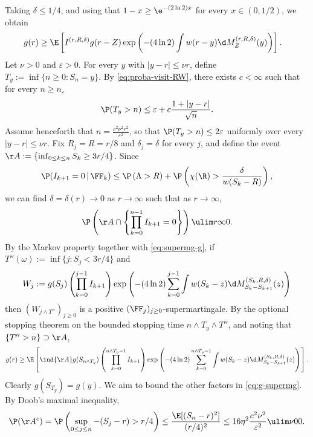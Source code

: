 \documentclass[10pt,a4paper]{article}
\begin{document}
Taking $\delta\leq 1/4$, and using that $1 - x \geq \e^{- (2 \ln 2) x}$ for every $x\in (0,1/2)$, 
we obtain
\begin{align}\label{eq:supermg-g}
g(r) &\geq \E\left[ I^{(r,R,\delta)} g(r-Z) \exp\left(- (4\ln 2) \int w(r-y) \d M_Z^{(r,R,\delta)}(y) \right) \right] .
\end{align}
%
%
Let $\nu>0$ and $\varepsilon>0$. For every $y$ with $|y-r|\leq \nu r$, define $T_y := \inf\{n \geq 0 : S_n = y\}$. By \eqref{eq:proba-visit-RW}, there exists $c<\infty$ such that for every $n\geq n_\varepsilon$ 
\[ \P(T_y > n) \leq \varepsilon + c\frac{1+|y-r|}{\sqrt{n}} . \]
Assume henceforth that $n = \frac{c^2 \nu^2 r^2}{\varepsilon^2}$, so that $\P(T_y > n) \leq 2\varepsilon$ uniformly over every $|y-r|\leq \nu r$. 
%
%
Fix $R_j = R = r/8$ and $\delta_j = \delta$ for every $j$, and define the event $\AA := \{ \inf_{0\leq k \leq n} S_k \geq 3r/4 \}$. 
Since
\[ \P(I_{k+1} = 0 \, | \, \FF_k) \leq \P\left(\Lambda > R\right) + \P\left(\chi(\R)>\frac{\delta}{w(S_k-R)}\right) , \]
we can find $\delta = \delta(r) \to 0$ as $r\to\infty$ such that as $r\to\infty$, %
\[ \P\left(\AA \cap \left\{\prod_{k=0}^{n-1} I_{k+1} = 0 \right\}\right) \ulim r \infty 0 . \]
%
%
By the Markov property together with \eqref{eq:supermg-g}, if $T''(\omega) := \inf\{j : S_j < 3r/4\}$ and 
\begin{align*}
W_j := g(S_j) \left(\prod_{k=0}^{j-1} I_{k+1}\right) \exp\left(- (4\ln 2) \sum_{k=0}^{j-1} \int w(S_k-z) \d M_{S_k-S_{k+1}}^{(S_k, R, \delta)}(z) \right)
\end{align*}
then $(W_{j\wedge T''})_{j\geq 0}$ 
is a positive $(\FF_j)_{j\geq 0}$-supermartingale. By the optional stopping theorem on the bounded stopping time $n \wedge T_y \wedge T''$, and noting that $\{T''>n\} \supset \AA$, 
\begin{align}\label{eq:g-supermg}
g(r) \geq \E\left[ \ind{\AA} g(S_{n\wedge T_y}) \left(\prod_{k=0}^{n\wedge T_y-1} I_{k+1}\right) \exp\left(- (4\ln 2) \sum_{k=0}^{n\wedge T_y-1} \int w(S_k-z) \d M_{S_k-S_{k+1}}^{(S_k, R, \delta)}(z) \right) \right] .
\end{align}
%
Clearly $g(S_{T_y}) = g(y)$. We aim to bound the other factors in \eqref{eq:g-supermg}. By Doob's maximal inequality, 
\[ \P(\AA^c) = \P\left( \sup_{0\leq j \leq n} -(S_j-r) > r/4\right) \leq \frac{\E[(S_n-r)^2]}{(r/4)^2} \leq 16 \eta^2 \frac{c^2 \nu^2}{\varepsilon^2} \ulim \nu 0 0 . \]
\end{document}
